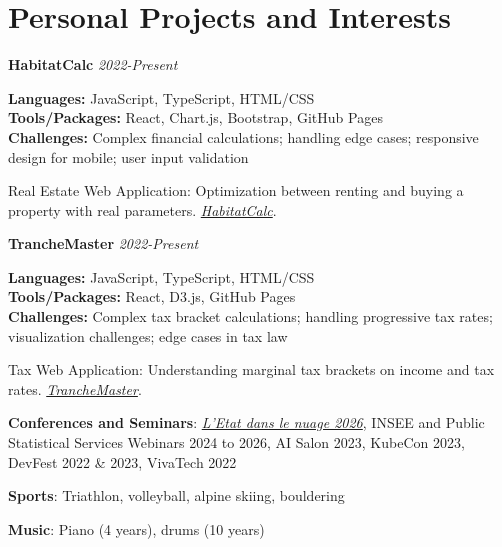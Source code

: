\documentclass[a4paper,10pt]{article}
\newcommand{\resumeItem}[2]{
  \item\small{
    \textbf{#1}{: #2\vspace{-0.8pt}}
  }
}
\newcommand{\resumeSubItem}[2]{
    \small{\resumeItem{#1}{#2}\vspace{-4pt}}
	
}
\newcommand{\resumeSubHeadingListStart}{\begin{itemize}[leftmargin=*]}
\newcommand{\resumeSubHeadingListEnd}{\end{itemize}}
\newcommand{\resumeDetailedProject}[5]{
    \item\small{
        \textbf{#1} \hfill \textit{#2} \\ 
        \begin{minipage}{0.95\textwidth}
            \small{\textbf{Languages:} #3 \\ 
            \textbf{Tools/Packages:} #4 \\ 
            \textbf{Challenges:} #5}
        \end{minipage}
    }
    \vspace{3pt}
}
\begin{document}

\section{Personal Projects and Interests}
\vspace{0.5mm}
\begin{minipage}[t]{0.9865\textwidth}
\resumeSubHeadingListStart

\resumeDetailedProject
    {HabitatCalc}
    {2022-Present}
    {JavaScript, TypeScript, HTML/CSS}
    {React, Chart.js, Bootstrap, GitHub Pages}
    {Complex financial calculations; handling edge cases; responsive design for mobile; user input validation}
    {Real Estate Web Application: Optimization between renting and buying a property with real parameters. \href{https://odysseu.github.io/HabitatCalc/}{\textit{HabitatCalc}}}.

\resumeDetailedProject
    {TrancheMaster}
    {2022-Present}
    {JavaScript, TypeScript, HTML/CSS}
    {React, D3.js, GitHub Pages}
    {Complex tax bracket calculations; handling progressive tax rates; visualization challenges; edge cases in tax law}
    {Tax Web Application: Understanding marginal tax brackets on income and tax rates. \href{https://odysseu.github.io/TrancheMaster/}{\textit{TrancheMaster}}}.

  \resumeSubItem{Conferences and Seminars}{\href{https://www.numerique.gouv.fr/agenda/etat-dans-le-nuage-2026/}{\textit{L'Etat dans le nuage 2026}}, INSEE and Public Statistical Services Webinars 2024 to 2026, AI Salon 2023, KubeCon 2023, DevFest 2022 \& 2023, VivaTech 2022}
  \resumeSubItem{Sports}{Triathlon, volleyball, alpine skiing, bouldering}
  \resumeSubItem{Music}{Piano (4 years), drums (10 years)}
\resumeSubHeadingListEnd
\end{minipage}


\end{document}

